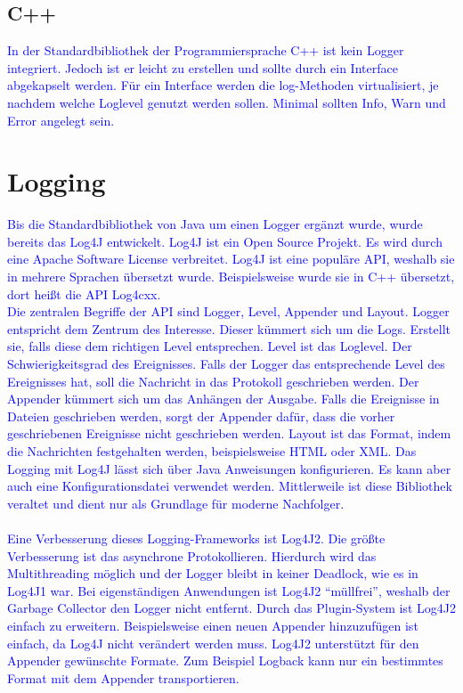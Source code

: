 \subsection{C++}\label{subsec:c++}
\textcolor{blue}{
In der Standardbibliothek der Programmiersprache C++ ist kein Logger integriert.
Jedoch ist er leicht zu erstellen und sollte durch ein Interface abgekapselt werden.
Für ein Interface werden die log-Methoden virtualisiert, je nachdem welche Loglevel genutzt werden sollen.
Minimal sollten Info, Warn und Error angelegt sein.
}\autocite{c++}

\section{Logging}\label{sec:logging-verfahren}

\textcolor{blue}{
    Bis die Standardbibliothek von Java um einen Logger ergänzt wurde, wurde bereits das Log4J entwickelt.
    Log4J ist ein Open Source Projekt.
    Es wird durch eine Apache Software License verbreitet.
    Log4J ist eine populäre API, weshalb sie in mehrere Sprachen übersetzt wurde.
    Beispielsweise wurde sie in C++ übersetzt, dort heißt die API Log4cxx.
    \\
    Die zentralen Begriffe der API sind Logger, Level, Appender und Layout.
    Logger entspricht dem Zentrum des Interesse.
    Dieser kümmert sich um die Logs.
    Erstellt sie, falls diese dem richtigen Level entsprechen.
    Level ist das Loglevel.
    Der Schwierigkeitsgrad des Ereignisses.
    Falls der Logger das entsprechende Level des Ereignisses hat, soll die Nachricht in das Protokoll geschrieben werden.
    Der Appender kümmert sich um das Anhängen der Ausgabe.
    Falls die Ereignisse in Dateien geschrieben werden, sorgt der Appender dafür, dass die vorher geschriebenen Ereignisse nicht geschrieben werden.
    Layout ist das Format, indem die Nachrichten festgehalten werden, beispielsweise HTML oder XML.
    Das Logging mit Log4J lässt sich über Java Anweisungen konfigurieren.
    Es kann aber auch eine Konfigurationsdatei verwendet werden.
    Mittlerweile ist diese Bibliothek veraltet und dient nur als Grundlage für moderne Nachfolger.
    \\
    \\
    Eine Verbesserung dieses Logging-Frameworks ist Log4J2.
    Die größte Verbesserung ist das asynchrone Protokollieren.
    Hierdurch wird das Multithreading möglich und der Logger bleibt in keiner Deadlock, wie es in Log4J1 war.
    Bei eigenständigen Anwendungen ist Log4J2 \enquote{müllfrei}, weshalb der Garbage Collector den Logger nicht entfernt.
    Durch das Plugin-System ist Log4J2 einfach zu erweitern.
    Beispielsweise einen neuen Appender hinzuzufügen ist einfach, da Log4J nicht verändert werden muss.
    Log4J2 unterstützt für den Appender gewünschte Formate.
    Zum Beispiel Logback kann nur ein bestimmtes Format mit dem Appender transportieren.
}\autocite{rheinwerk, baeldung, log4j2}


